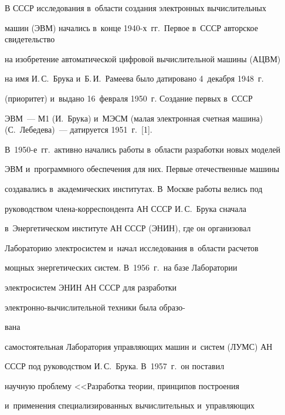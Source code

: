 \vspace*{-2pt}



   В СССР исследования в~области создания электронных вы\-чис\-ли\-тель\-ных 

машин (ЭВМ) начались в~конце 1940-х~гг.\ Пер\-вое в~\mbox{СССР} авторское свидетельство 

на изобретение автоматической циф\-ро\-вой вы\-чис\-ли\-тель\-ной машины (\mbox{АЦВМ}) 

на имя И.\,С.~Брука и~Б.\,И.~Рамеева было датировано 4~декабря 1948~г.\ 

(приоритет) и~выдано 16~февраля 1950~г. Создание пер\-вых в~\mbox{СССР} 

ЭВМ~--- М1 (И.~Брука) и~\mbox{МЭСМ} (малая электронная счетная машина)  (С.~Лебедева)~--- датируется 1951~г.~[1]. 

В~1950-е~гг.\ активно начались работы в~об\-ласти разработки новых моделей 

ЭВМ и~программного обеспечения для них. Пер\-вые отечественные машины 

создавались в~академических институтах. В~Москве работы велись под 

руководством чле\-на-кор\-рес\-пон\-ден\-та АН СССР И.\,С.~Брука сначала 

в~Энергетическом институте АН СССР (\mbox{ЭНИН}), где он организовал 

Лабораторию электросистем и~начал исследования в~об\-ласти расчетов 

мощ\-ных энергетических сис\-тем. В~1956~г.\ на базе Лаборатории  

элект\-ро\-сис\-тем \mbox{ЭНИН} АН \mbox{СССР} для разработки  

элект\-рон\-но-вы\-чис\-ли\-тель\-ной техники была образо-\linebreak\vspace*{-12pt}



\pagebreak



\noindent

вана 

самостоятельная Лаборатория управ\-ля\-ющих машин и~сис\-тем (ЛУМС) АН 

\mbox{СССР} под руководством И.\,С.~Бру\-ка. В~1957~г.\ он поставил 

научную проб\-ле\-му <<Разработка тео\-рии, принципов по\-стро\-ения 

и~применения специализированных вы\-чис\-ли\-тель\-ных и~управ\-ля\-ющих 

